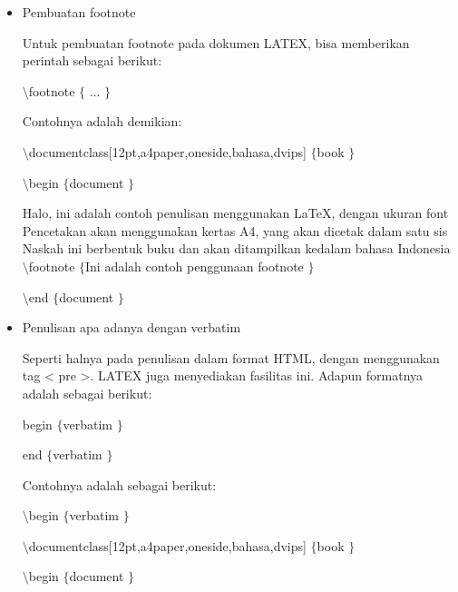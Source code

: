 \begin{itemize}
\vspace{14pt}
\noindent 
\item Pembuatan footnote \par
Untuk pembuatan footnote pada dokumen LATEX, bisa memberikan perintah sebagai berikut: \par
{\fontsize{10pt}{10pt}\selectfont  $  \setminus  $footnote $  \{  $ ...  $  \}  $} \par
\vspace{12pt}
Contohnya adalah demikian: \par
{\fontsize{10pt}{10pt}\selectfont  $  \setminus  $documentclass[12pt,a4paper,oneside,bahasa,dvips] $  \{  $book $  \}  $} \par
{\fontsize{10pt}{10pt}\selectfont  $  \setminus  $begin $  \{  $document $  \}  $} \par
\vspace{12pt}
{\fontsize{10pt}{10pt}\selectfont Halo, ini adalah contoh penulisan menggunakan LaTeX, dengan ukuran font Pencetakan akan menggunakan kertas A4, yang akan dicetak dalam satu sis Naskah ini berbentuk buku dan akan ditampilkan kedalam bahasa Indonesia  $  \setminus  $footnote $  \{  $Ini adalah contoh penggunaan footnote $  \}  $} \par
\vspace{9pt}
{\fontsize{10pt}{10pt}\selectfont  $  \setminus  $end $  \{  $document $  \}  $} \par
\vspace{10pt}
\noindent 
\item Penulisan apa adanya dengan verbatim \par
Seperti halnya pada penulisan dalam format HTML, dengan menggunakan tag < pre >. LATEX juga menyediakan fasilitas ini. Adapun formatnya adalah sebagai berikut: \par
begin $  \{  $verbatim $  \}  $ \par
[kalimat] \par
end $  \{  $verbatim $  \}  $ \par
\vspace{8pt}
\vspace{8pt}
Contohnya adalah sebagai berikut: \par
{\fontsize{10pt}{10pt}\selectfont  $  \setminus  $begin $  \{  $verbatim $  \}  $} \par
{\fontsize{10pt}{10pt}\selectfont  $  \setminus  $documentclass[12pt,a4paper,oneside,bahasa,dvips] $  \{  $book $  \}  $} \par
{\fontsize{10pt}{10pt}\selectfont  $  \setminus  $begin $  \{  $document $  \}  $} \par

\end{itemize}
